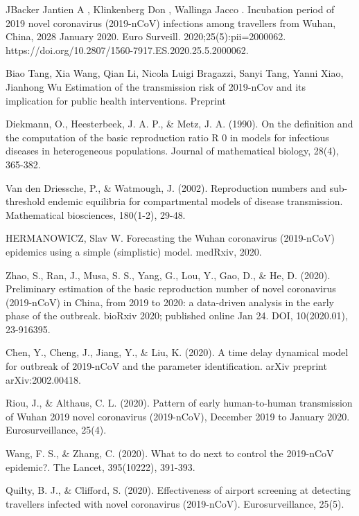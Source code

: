 \begin{thebibliography}{222}
   JBacker Jantien A , Klinkenberg Don , Wallinga Jacco .
  Incubation period of 2019 novel coronavirus (2019-nCoV) infections among
  travellers from Wuhan, China, 2028 January 2020. Euro Surveill.
  2020;25(5):pii=2000062.
  https://doi.org/10.2807/1560-7917.ES.2020.25.5.2000062.

   Biao Tang, Xia Wang, Qian Li, Nicola Luigi Bragazzi, Sanyi
  Tang, Yanni Xiao, Jianhong Wu Estimation of the transmission risk of
  2019-nCov and its implication for public health interventions. Preprint

   Diekmann, O., Heesterbeek, J. A. P., \& Metz, J. A.
  (1990). On the definition and the computation of the basic reproduction
  ratio R 0 in models for infectious diseases in heterogeneous populations.
  Journal of mathematical biology, 28(4), 365-382.

   Van den Driessche, P., \& Watmough, J. (2002).
  Reproduction numbers and sub-threshold endemic equilibria for compartmental
  models of disease transmission. Mathematical biosciences, 180(1-2), 29-48.

   HERMANOWICZ, Slav W. Forecasting the Wuhan coronavirus
  (2019-nCoV) epidemics using a simple (simplistic) model. medRxiv, 2020.

   Zhao, S., Ran, J., Musa, S. S., Yang, G., Lou, Y., Gao, D., \&
  He, D. (2020). Preliminary estimation of the basic reproduction number of
  novel coronavirus (2019-nCoV) in China, from 2019 to 2020: a data-driven
  analysis in the early phase of the outbreak. bioRxiv 2020; published online
  Jan 24. DOI, 10(2020.01), 23-916395.

   Chen, Y., Cheng, J., Jiang, Y., \& Liu, K. (2020). A time
  delay dynamical model for outbreak of 2019-nCoV and the parameter
  identification. arXiv preprint arXiv:2002.00418.

   Riou, J., \& Althaus, C. L. (2020). Pattern of early
  human-to-human transmission of Wuhan 2019 novel coronavirus (2019-nCoV),
  December 2019 to January 2020. Eurosurveillance, 25(4).

   Wang, F. S., \& Zhang, C. (2020). What to do next to
  control the 2019-nCoV epidemic?. The Lancet, 395(10222), 391-393.

   Quilty, B. J., \& Clifford, S. (2020). Effectiveness of
  airport screening at detecting travellers infected with novel coronavirus
  (2019-nCoV). Eurosurveillance, 25(5).


\end{thebibliography}
